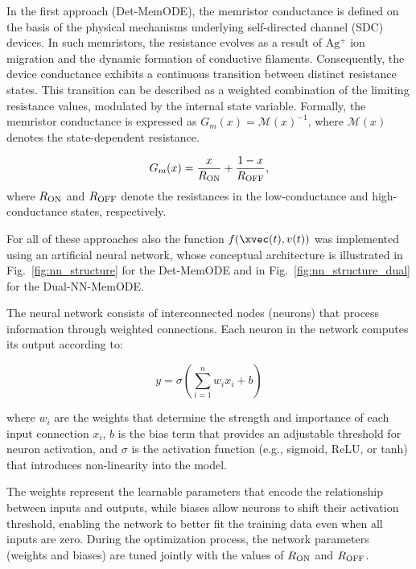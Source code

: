 \documentclass[11pt, oneside]{article}
\newcommand{\M}{\mathcal{M}}
\newcommand{\Ron}{R_{\rm ON}}
\newcommand{\Roff}{R_{\rm OFF}}
\newcommand{\ua}{v}
\begin{document}
In the first approach (Det-MemODE), the memristor conductance is defined on the basis of the physical mechanisms underlying self-directed channel (SDC) devices. In such memristors, the resistance evolves as a result of $\mathrm{Ag^+}$ ion migration and the dynamic formation of conductive filaments. Consequently, the device conductance exhibits a continuous transition between distinct resistance states. This transition can be described as a weighted combination of the limiting resistance values, modulated by the internal state variable. Formally, the memristor conductance is expressed as $G_m(x) = \M(x)^{-1}$, where $\M(x)$ denotes the state-dependent resistance.

\begin{equation}
    G_{m}(x) = \frac{x}{R_{\rm ON}} + \frac{1 - x}{R_{\rm OFF}},
    \label{eq:conductance}
\end{equation}
where $\Ron$ and $\Roff$ denote the resistances in the low-conductance and high-conductance states, respectively.


For all of these approaches also the function $f(\xvec(t), \ua(t))$ was implemented using an artificial neural network, whose conceptual architecture is illustrated in Fig.~\ref{fig:nn_structure} for the Det-MemODE and in Fig.~\ref{fig:nn_structure_dual} for the Dual-NN-MemODE.

The neural network consists of interconnected nodes (neurons) that process information through weighted connections. Each neuron in the network computes its output according to:

\begin{equation}
    y = \sigma\left(\sum_{i=1}^{n} w_i x_i + b\right)
\end{equation}

where $w_i$ are the weights that determine the strength and importance of each input connection $x_i$, $b$ is the bias term that provides an adjustable threshold for neuron activation, and $\sigma$ is the activation function (e.g., sigmoid, ReLU, or tanh) that introduces non-linearity into the model.

The weights represent the learnable parameters that encode the relationship between inputs and outputs, while biases allow neurons to shift their activation threshold, enabling the network to better fit the training data even when all inputs are zero. During the optimization process, the network parameters (weights and biases) are tuned jointly with the values of $R_{\rm ON}$ and $R_{\rm OFF}$.
\end{document}
